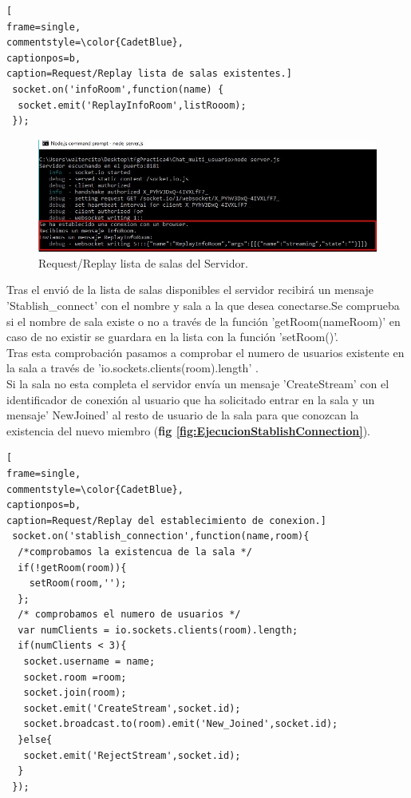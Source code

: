 \begin{lstlisting}[
frame=single,
commentstyle=\color{CadetBlue},
captionpos=b,
caption=Request/Replay lista de salas existentes.]
 socket.on('infoRoom',function(name) {
  socket.emit('ReplayInfoRoom',listRooom);
 });
\end{lstlisting}
\begin{figure}[!h]
\begin{center}
   \includegraphics[width=0.6\linewidth]{Figures/InfoRoomServer}
	\decoRule
	\caption[Request/Replay Salas Servidor]{Request/Replay lista de salas del Servidor.}
\label{fig:EjecucionInfoRoom}
\end{center}
\end{figure}
Tras el envió de la lista de salas disponibles el servidor recibirá un mensaje 'Stablish\_connect' con el nombre y sala a la que desea conectarse.Se comprueba si el nombre de sala existe o no a través de la función 'getRoom(nameRoom)' en caso de no existir se guardara en la lista con la función 'setRoom()'.
\\Tras esta comprobación pasamos a comprobar el numero de usuarios existente en la sala a través de 'io.sockets.clients(room).length' .
\\Si la sala no esta completa el servidor envía un mensaje 'CreateStream' con el identificador de conexión al usuario que ha solicitado entrar en la sala y un mensaje' NewJoined' al resto de usuario de la sala para que conozcan la existencia del nuevo miembro (\textbf{fig \ref{fig:EjecucionStablishConnection}}).
\begin{lstlisting}[
frame=single,
commentstyle=\color{CadetBlue},
captionpos=b,
caption=Request/Replay del establecimiento de conexion.]
 socket.on('stablish_connection',function(name,room){
  /*comprobamos la existencua de la sala */
  if(!getRoom(room)){
    setRoom(room,'');
  };
  /* comprobamos el numero de usuarios */
  var numClients = io.sockets.clients(room).length;
  if(numClients < 3){
   socket.username = name;
   socket.room =room;
   socket.join(room);
   socket.emit('CreateStream',socket.id);
   socket.broadcast.to(room).emit('New_Joined',socket.id);
  }else{
   socket.emit('RejectStream',socket.id);
  }
 });
\end{lstlisting}

